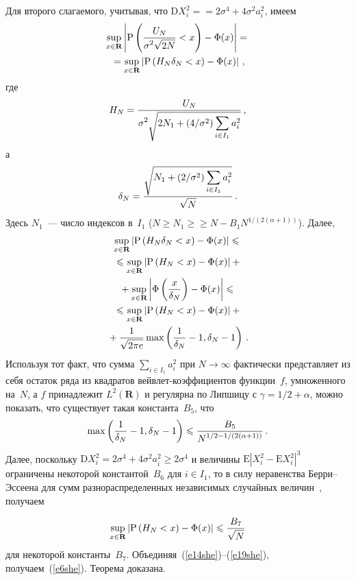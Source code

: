 \begin{multicols}{2}
Для второго слагаемого, учитывая, что $\mbox{D}X_i^2=$\linebreak $=2\sigma^4+4\sigma^2a_i^2$, имеем
\begin{multline*}
\sup\limits_{x\in\mathbf{R}}\left\vert\mbox{P}\left(\displaystyle\frac{\displaystyle U_N\mathstrut}{\displaystyle \sigma^2\sqrt{2N}\mathstrut}<x\right)-\Phi(x)\right\vert={}\\
{}=
\sup\limits_{x\in\mathbf{R}}\left\vert\mbox{P}\left(H_N\delta_N<x\right)-\Phi(x)\right\vert\,,
\end{multline*}
где
$$
H_N=\displaystyle\frac{\displaystyle U_N\mathstrut}{\displaystyle \sigma^2\sqrt{2N_1+\left(4/\sigma^{2}\right)\sum\limits_{i\in I_1}a_i^2}\mathstrut}\,,
$$
а
$$  
\delta_N=\displaystyle\frac{\displaystyle \sqrt{N_1+\left (2/\sigma^{2}\right)\sum\limits_{i\in I_1}a_i^2}\mathstrut}{\displaystyle \sqrt{N}\mathstrut}\,.
$$
Здесь  $N_1$~--- число индексов в~$I_1$ ($N\geqslant N_1\geqslant$\linebreak $\geqslant N-B_1 N^{1/(2(\alpha+1))}$).
Далее,
\begin{multline}
\sup\limits_{x\in\mathbf{R}}\left\vert\mbox{P}\left(H_N\delta_N<x\right)-\Phi(x)\right\vert\leqslant{}\\
{}\leqslant
\sup\limits_{x\in\mathbf{R}}\left\vert\mbox{P}\left(H_N<x\right)-\Phi(x)\right\vert+{}\\
{}+
\sup\limits_{x\in\mathbf{R}}\left\vert\Phi\left(\displaystyle\frac{\displaystyle x\mathstrut}{\displaystyle \delta_N\mathstrut}\right)-\Phi(x)\right\vert\leqslant{}\\
{}\leqslant\sup\limits_{x\in\mathbf{R}}\left\vert\mbox{P}\left(H_N<x\right)-\Phi(x)\right\vert+{}\\
{}+
\displaystyle\frac{\displaystyle 1\mathstrut}{\displaystyle \sqrt{2\pi e}\mathstrut}\max\left(\displaystyle\frac{\displaystyle 1\mathstrut}{\displaystyle \delta_N\mathstrut}-1,\delta_N-1\right)\,.
\label{e17she}
\end{multline}
Используя тот факт, что сумма $\sum\limits_{i\in I_1}a_i^2$ при $N\rightarrow\infty$ 
фактически представляет из себя остаток ряда из квадратов вейвлет-коэффициентов функции~$f$, 
умноженного на~$N$, а $f$ принадлежит $L^2(\mathbf{R})$ и регулярна по Липшицу с 
$\gamma=1/2+\alpha$, можно показать, что существует такая константа~$B_5$, что
\begin{equation}
\max\left(\displaystyle\frac{\displaystyle 1\mathstrut}{\displaystyle \delta_N\mathstrut}-1,\delta_N-1\right)\leqslant\displaystyle\frac{\displaystyle B_5\mathstrut}{\displaystyle N^{1/2-1/(2(\alpha+1))}\mathstrut}\,.
\label{e18she}
\end{equation}
Далее, поскольку $\mbox{D}X_i^2=2\sigma^4+4\sigma^2a_i^2\geqslant2\sigma^4$ и величины 
$\mbox{E}|X_i^2-\mbox{E}X_i^2|^3$ ограничены некоторой константой~$B_6$ для $i\in I_1$, то в силу неравенства 
Берри--Эс\-се\-ена для сумм разнораспределенных независимых случайных величин~\cite{15she}, получаем

\noindent
\begin{equation}
\sup\limits_{x\in\mathbf{R}}\left\vert\mbox{P}\left(H_N<x\right)-\Phi(x)\right\vert\leqslant\displaystyle\frac{\displaystyle B_7\mathstrut}{\displaystyle \sqrt{N}\mathstrut}
\label{e19she}
\end{equation}
для некоторой константы~$B_7$.
Объединяя~(\ref{e14she})--(\ref{e19she}), получаем~(\ref{e6she}). Теорема доказана.
\smallskip


\end{multicols}
